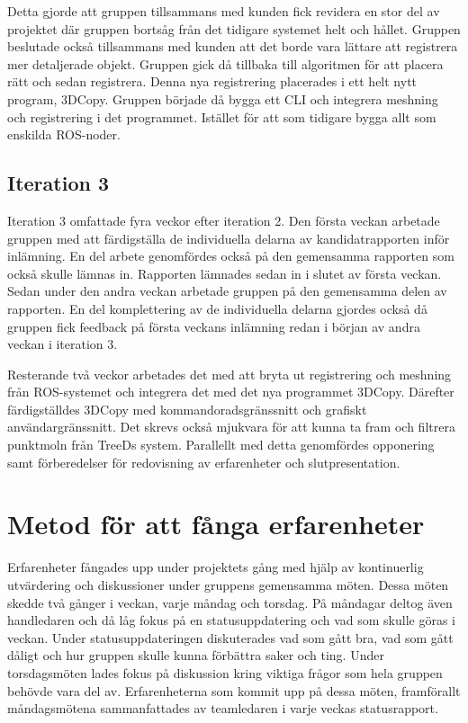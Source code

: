 Detta gjorde att gruppen tillsammans med kunden fick revidera en stor del av projektet där gruppen bortsåg från det tidigare systemet helt och hållet. Gruppen beslutade också tillsammans med kunden att det borde vara lättare att registrera mer detaljerade objekt. Gruppen gick då tillbaka till algoritmen för att placera rätt och sedan registrera. Denna nya registrering placerades i ett helt nytt program, 3DCopy. Gruppen började då bygga ett CLI och integrera meshning och registrering i det programmet. Istället för att som tidigare bygga allt som enskilda ROS-noder.

\subsection{Iteration 3}

Iteration 3 omfattade fyra veckor efter iteration 2. Den första veckan arbetade gruppen med att färdigställa de individuella delarna av kandidatrapporten inför inlämning. En del arbete genomfördes också på den gemensamma rapporten som också skulle lämnas in. Rapporten lämnades sedan in i slutet av första veckan. Sedan under den andra veckan arbetade gruppen på den gemensamma delen av rapporten. En del komplettering av de individuella delarna gjordes också då gruppen fick feedback på första veckans inlämning redan i början av andra veckan i iteration 3.

Resterande två veckor arbetades det med att bryta ut registrering och meshning från ROS-systemet och integrera det med det nya programmet 3DCopy. Därefter färdigställdes 3DCopy med kommandoradsgränssnitt och grafiskt användargränssnitt. Det skrevs också mjukvara för att kunna ta fram och filtrera punktmoln från TreeDs system. Parallellt med detta genomfördes opponering samt förberedelser för redovisning av erfarenheter och slutp\-resentation.  


\section{Metod för att fånga erfarenheter}

Erfarenheter fångades upp under projektets gång med hjälp av kontinuerlig utvärdering och diskussioner under gruppens gemensamma möten. Dessa möten skedde två gånger i veckan, varje måndag och torsdag. På måndagar deltog även handledaren och då låg fokus på en statusuppdatering och vad som skulle göras i veckan. Under statusuppdateringen diskuterades vad som gått bra, vad som gått dåligt och hur gruppen skulle kunna förbättra saker och ting. Under torsdagsmöten lades fokus på diskussion kring viktiga frågor som hela gruppen behövde vara del av. Erfarenheterna som kommit upp på dessa möten, framförallt måndagsmötena sammanfattades av teamledaren i varje veckas statusrapport.

